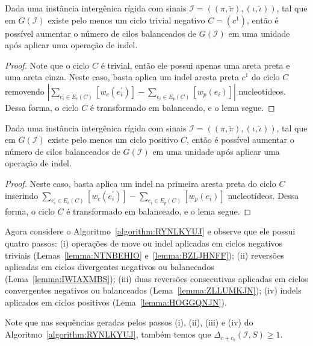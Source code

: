 \begin{lemma}\label{lemma:BZLJHNFF}
Dada uma instância intergênica rígida com sinais $\mathcal{I}=((\pi,\breve\pi),(\iota,\breve\iota))$, tal que em $G(\mathcal{I})$ existe pelo menos um ciclo trivial negativo $C=(c^1)$, então é possível aumentar o número de cilos balanceados de $G(\mathcal{I})$ em uma unidade após aplicar uma operação de indel.
\end{lemma}
\begin{proof}
Note que o ciclo $C$ é trivial, então ele possui apenas uma areta preta e uma areta cinza. Neste caso, basta aplica um indel aresta preta $c^1$ do ciclo $C$ removendo $|\sum_{e^{\prime}_i \in E_c(C)} [w_c(e^{\prime}_i)] - \sum_{e_i \in E_p(C)} [w_p(e_i)]|$ nucleotídeos. Dessa forma, o ciclo $C$ é transformado em balanceado, e o lema segue.
\end{proof}

\begin{lemma}\label{lemma:HOGGQNJN}
Dada uma instância intergênica rígida com sinais $\mathcal{I}=((\pi,\breve\pi),(\iota,\breve\iota))$, tal que em $G(\mathcal{I})$ existe pelo menos um ciclo positivo $C$, então é possível aumentar o número de cilos balanceados de $G(\mathcal{I})$ em uma unidade após aplicar uma operação de indel.
\end{lemma}
\begin{proof}
Neste caso, basta aplica um indel na primeira aresta preta do ciclo $C$ inserindo $\sum_{e^{\prime}_i \in E_c(C)} [w_c(e^{\prime}_i)] - \sum_{e_i \in E_p(C)} [w_p(e_i)]$ nucleotídeos. Dessa forma, o ciclo $C$ é transformado em balanceado, e o lema segue. 
\end{proof}

Agora considere o Algoritmo~\ref{algorithm:RYNLKYUJ} e observe que ele possui quatro passos: (i) operações de move ou indel aplicadas em ciclos negativos triviais (Lemas~\ref{lemma:NTNBEHIO} e~\ref{lemma:BZLJHNFF}); (ii) reversões aplicadas em ciclos divergentes negativos ou balanceados (Lema~\ref{lemma:IWIAXMBS}); (iii) duas reversões consecutivas aplicadas em ciclos convergentes negativos ou balanceados (Lema~\ref{lemma:ZLLUMKJN}); (iv) indels aplicados em ciclos positivos (Lema~\ref{lemma:HOGGQNJN}).



Note que nas sequências geradas pelos passos (i), (ii), (iii) e (iv) do Algoritmo~\ref{algorithm:RYNLKYUJ}, também temos que $\Delta_{c+c_b}(\mathcal{I},S) \ge 1$.

